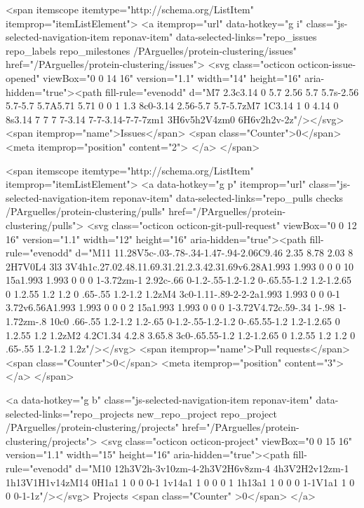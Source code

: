     <span itemscope itemtype="http://schema.org/ListItem" itemprop="itemListElement">
      <a itemprop="url" data-hotkey="g i" class="js-selected-navigation-item reponav-item" data-selected-links="repo_issues repo_labels repo_milestones /PArguelles/protein-clustering/issues" href="/PArguelles/protein-clustering/issues">
        <svg class="octicon octicon-issue-opened" viewBox="0 0 14 16" version="1.1" width="14" height="16" aria-hidden="true"><path fill-rule="evenodd" d="M7 2.3c3.14 0 5.7 2.56 5.7 5.7s-2.56 5.7-5.7 5.7A5.71 5.71 0 0 1 1.3 8c0-3.14 2.56-5.7 5.7-5.7zM7 1C3.14 1 0 4.14 0 8s3.14 7 7 7 7-3.14 7-7-3.14-7-7-7zm1 3H6v5h2V4zm0 6H6v2h2v-2z"/></svg>
        <span itemprop="name">Issues</span>
        <span class="Counter">0</span>
        <meta itemprop="position" content="2">
</a>    </span>

  <span itemscope itemtype="http://schema.org/ListItem" itemprop="itemListElement">
    <a data-hotkey="g p" itemprop="url" class="js-selected-navigation-item reponav-item" data-selected-links="repo_pulls checks /PArguelles/protein-clustering/pulls" href="/PArguelles/protein-clustering/pulls">
      <svg class="octicon octicon-git-pull-request" viewBox="0 0 12 16" version="1.1" width="12" height="16" aria-hidden="true"><path fill-rule="evenodd" d="M11 11.28V5c-.03-.78-.34-1.47-.94-2.06C9.46 2.35 8.78 2.03 8 2H7V0L4 3l3 3V4h1c.27.02.48.11.69.31.21.2.3.42.31.69v6.28A1.993 1.993 0 0 0 10 15a1.993 1.993 0 0 0 1-3.72zm-1 2.92c-.66 0-1.2-.55-1.2-1.2 0-.65.55-1.2 1.2-1.2.65 0 1.2.55 1.2 1.2 0 .65-.55 1.2-1.2 1.2zM4 3c0-1.11-.89-2-2-2a1.993 1.993 0 0 0-1 3.72v6.56A1.993 1.993 0 0 0 2 15a1.993 1.993 0 0 0 1-3.72V4.72c.59-.34 1-.98 1-1.72zm-.8 10c0 .66-.55 1.2-1.2 1.2-.65 0-1.2-.55-1.2-1.2 0-.65.55-1.2 1.2-1.2.65 0 1.2.55 1.2 1.2zM2 4.2C1.34 4.2.8 3.65.8 3c0-.65.55-1.2 1.2-1.2.65 0 1.2.55 1.2 1.2 0 .65-.55 1.2-1.2 1.2z"/></svg>
      <span itemprop="name">Pull requests</span>
      <span class="Counter">0</span>
      <meta itemprop="position" content="3">
</a>  </span>


    <a data-hotkey="g b" class="js-selected-navigation-item reponav-item" data-selected-links="repo_projects new_repo_project repo_project /PArguelles/protein-clustering/projects" href="/PArguelles/protein-clustering/projects">
      <svg class="octicon octicon-project" viewBox="0 0 15 16" version="1.1" width="15" height="16" aria-hidden="true"><path fill-rule="evenodd" d="M10 12h3V2h-3v10zm-4-2h3V2H6v8zm-4 4h3V2H2v12zm-1 1h13V1H1v14zM14 0H1a1 1 0 0 0-1 1v14a1 1 0 0 0 1 1h13a1 1 0 0 0 1-1V1a1 1 0 0 0-1-1z"/></svg>
      Projects
      <span class="Counter" >0</span>
</a>

